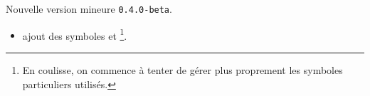 Nouvelle version mineure \verb+0.4.0-beta+.

\begin{itemize}[itemsep=.5em]
    \item {}
          ajout des symboles  et  
          \footnote{
          	En coulisse, on commence à tenter de gérer plus proprement les symboles particuliers utilisés.
		  }.
\end{itemize}

\separation